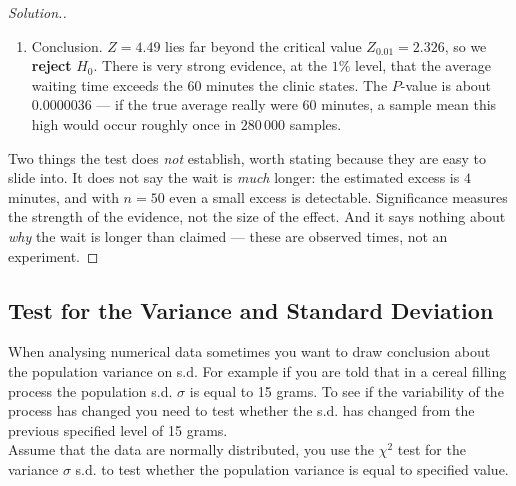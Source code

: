 \documentclass[11pt,a4paper]{article}
\theoremstyle{definition}
\newenvironment{solution}
  {\renewcommand{\qedsymbol}{}\begin{proof}[\textit{Solution}.]}
  {\end{proof}}
\begin{document}
\begin{solution}
\begin{enumerate}
\item Conclusion. $Z=4.49$ lies far beyond the critical value $Z_{0.01}=2.326$, so we
\textbf{reject} $H_0$. There is very strong evidence, at the $1\%$ level, that the average
waiting time exceeds the $60$ minutes the clinic states. The $P$-value is about
$0.0000036$ --- if the true average really were $60$ minutes, a sample mean this high would
occur roughly once in $280\,000$ samples.
\end{enumerate}

Two things the test does \emph{not} establish, worth stating because they are easy to slide
into. It does not say the wait is \emph{much} longer: the estimated excess is $4$ minutes, and
with $n=50$ even a small excess is detectable. Significance measures the strength of the
evidence, not the size of the effect. And it says nothing about \emph{why} the wait is longer
than claimed --- these are observed times, not an experiment.
\end{solution}











\subsection{Test for the Variance and Standard Deviation}
When analysing numerical data sometimes you want to draw conclusion about the population variance on s.d. For example if you are told that in a cereal filling process the population s.d. $\sigma$ is equal to 15 grams. To see if the variability of the process has changed you need to test whether the s.d. has changed from the previous specified level of 15 grams.\\ Assume that the data are normally distributed, you use the $\chi^2$ test for the variance $\sigma$ s.d. to test whether the population variance is equal to specified value.\\[1ex]
\end{document}

